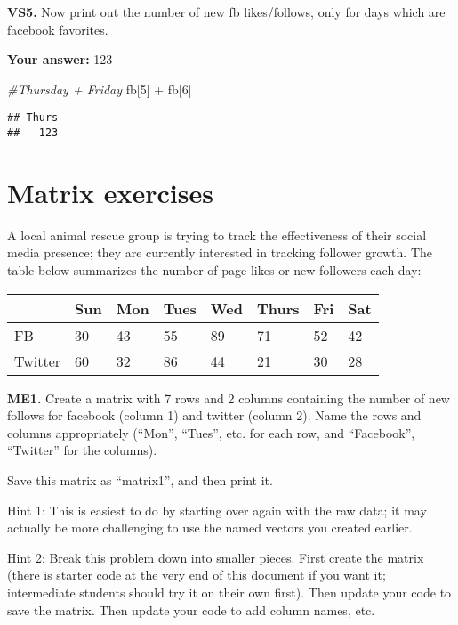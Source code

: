 \documentclass[
]{article}
\newenvironment{Shaded}{\begin{snugshade}}{\end{snugshade}}
\newcommand{\CommentTok}[1]{\textcolor[rgb]{0.56,0.35,0.01}{\textit{#1}}}
\newcommand{\DecValTok}[1]{\textcolor[rgb]{0.00,0.00,0.81}{#1}}
\newcommand{\NormalTok}[1]{#1}
\newcommand{\SpecialCharTok}[1]{\textcolor[rgb]{0.00,0.00,0.00}{#1}}
\begin{document}
\textbf{VS5.} Now print out the number of new fb likes/follows, only for
days which are facebook favorites.

\textbf{Your answer:} 123

\begin{Shaded}
\begin{Highlighting}[]
\CommentTok{\#Thursday + Friday}
\NormalTok{fb[}\DecValTok{5}\NormalTok{] }\SpecialCharTok{+}\NormalTok{ fb[}\DecValTok{6}\NormalTok{]}
\end{Highlighting}
\end{Shaded}

\begin{verbatim}
## Thurs 
##   123
\end{verbatim}

\hypertarget{matrix-exercises}{%
\section{Matrix exercises}\label{matrix-exercises}}

A local animal rescue group is trying to track the effectiveness of
their social media presence; they are currently interested in tracking
follower growth. The table below summarizes the number of page likes or
new followers each day:

\begin{longtable}[]{@{}llllllll@{}}
\toprule
& Sun & Mon & Tues & Wed & Thurs & Fri & Sat \\
\midrule
\endhead
FB & 30 & 43 & 55 & 89 & 71 & 52 & 42 \\
Twitter & 60 & 32 & 86 & 44 & 21 & 30 & 28 \\
\bottomrule
\end{longtable}

\textbf{ME1.} Create a matrix with 7 rows and 2 columns containing the
number of new follows for facebook (column 1) and twitter (column 2).
Name the rows and columns appropriately (``Mon'', ``Tues'', etc. for
each row, and ``Facebook'', ``Twitter'' for the columns).

Save this matrix as ``matrix1'', and then print it.

Hint 1: This is easiest to do by starting over again with the raw data;
it may actually be more challenging to use the named vectors you created
earlier.

Hint 2: Break this problem down into smaller pieces. First create the
matrix (there is starter code at the very end of this document if you
want it; intermediate students should try it on their own first). Then
update your code to save the matrix. Then update your code to add column
names, etc.
\end{document}
